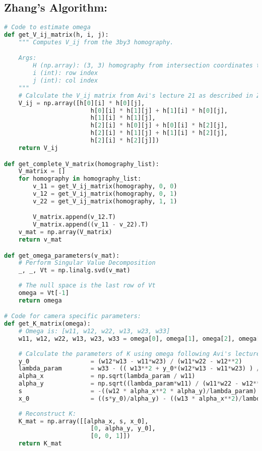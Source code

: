 \documentclass{article}
\begin{document}
\subsection{Zhang's Algorithm:}
\begin{lstlisting}[language=Python]
# Code to estimate omega
def get_V_ij_matrix(h, i, j):
    """ Computes V_ij from the 3by3 homography.

    Args:
        H (np.array): (3, 3) homography from intersection coordinates to real world points there
        i (int): row index
        j (int): col index
    """
    # Calculate the V_ij matrix from Avi's lecture 21 as described in Zhang's method
    V_ij = np.array([h[0][i] * h[0][j],
                        h[0][i] * h[1][j] + h[1][i] * h[0][j],
                        h[1][i] * h[1][j],
                        h[2][i] * h[0][j] + h[0][i] * h[2][j],
                        h[2][i] * h[1][j] + h[1][i] * h[2][j],
                        h[2][i] * h[2][j]])
    return V_ij

def get_complete_V_matrix(homography_list):
    V_matrix = []
    for homography in homography_list:
        v_11 = get_V_ij_matrix(homography, 0, 0)
        v_12 = get_V_ij_matrix(homography, 0, 1)
        v_22 = get_V_ij_matrix(homography, 1, 1)

        V_matrix.append(v_12.T)
        V_matrix.append((v_11 - v_22).T)
    v_mat = np.array(V_matrix)
    return v_mat

def get_omega_parameters(v_mat):
    # Perform Singular Value Decomposition
    _, _, Vt = np.linalg.svd(v_mat)
    
    # The null space is the last row of Vt
    omega = Vt[-1]
    return omega

# Code for camera specific parameters:
def get_K_matrix(omega):
    # Omega is: [w11, w12, w22, w13, w23, w33]
    w11, w12, w22, w13, w23, w33 = omega[0], omega[1], omega[2], omega[3], omega[4], omega[5]
    
    # Calculate the parameters of K using omega following Avi's lecture 21 page 3
    y_0                 = (w12*w13 - w11*w23) / (w11*w22 - w12**2)
    lambda_param        = w33 - (( w13**2 + y_0*(w12*w13 - w11*w23) ) / w11)
    alpha_x             = np.sqrt(lambda_param / w11)
    alpha_y             = np.sqrt((lambda_param*w11) / (w11*w22 - w12**2))
    s                   = -((w12 * alpha_x**2 * alpha_y)/lambda_param)
    x_0                 = ((s*y_0)/alpha_y) - ((w13 * alpha_x**2)/lambda_param)
    
    # Reconstruct K:
    K_mat = np.array([[alpha_x, s, x_0],
                        [0, alpha_y, y_0],
                        [0, 0, 1]])
    return K_mat


\end{lstlisting}
\end{document}
